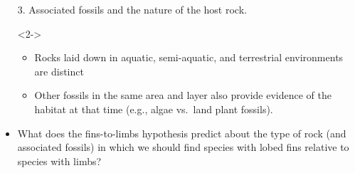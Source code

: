 \begin{frame}[t]
    \begin{adjustwidth}{-2em}{-1.5em}

        \begin{itemize}
            \item[3.] Associated fossils and the nature of the host rock.

            \begin{uncoverenv}<2->
            \begin{itemize}
                \item Rocks laid down in aquatic, semi-aquatic, and terrestrial
                    environments are distinct

                \item Other fossils in the same area and layer also provide
                    evidence of the habitat at that time (e.g., algae vs.\ land
                    plant fossils).

            \end{itemize}
            \end{uncoverenv}

            \item<3-> What does the fins-to-limbs hypothesis predict about the
                type of rock (and associated fossils) in which we should find
                species with lobed fins relative to species with limbs?


        \end{itemize}

    \end{adjustwidth}
\end{frame}

